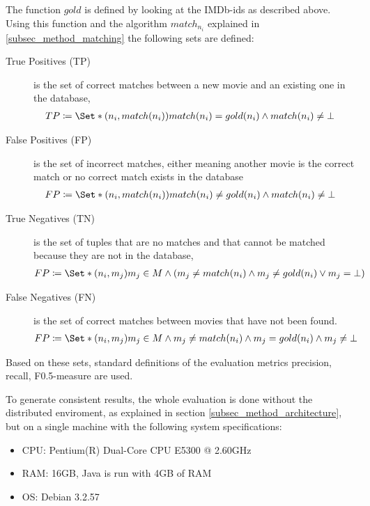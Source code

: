 The function $gold$ is defined by looking at the IMDb-ids as described above.
Using this function and the algorithm $match_{n_{i}}$ explained in \ref{subsec_method_matching} the following sets are defined:

\begin{description}
\item[True Positives (TP)] is the set of correct matches between a new movie and an existing one in the database,
\begin{align}
TP &\coloneqq \Set*{(n_i, match(n_i))}{match(n_i) = gold(n_i) \land match(n_i) \neq \bot}
\end{align}
\item[False Positives (FP)] is the set of incorrect matches, either meaning another movie is the correct match or no correct match exists in the database
\begin{align}
FP &\coloneqq \Set*{(n_i, match(n_i))}{match(n_i) \neq gold(n_i) \land match(n_i) \neq \bot}
\end{align}\item[True Negatives (TN)] is the set of tuples that are no matches and that cannot be matched because they are not in the database,
\begin{align}
FP &\coloneqq \Set*{(n_i, m_j)}{m_j \in M \land (m_j \neq match(n_i) \land m_j \neq gold(n_i) \lor m_j = \bot)}
\end{align}
\item[False Negatives (FN)] is the set of correct matches between movies that have not been found.
\begin{align}
FP &\coloneqq \Set*{(n_i, m_j)}{m_j \in M \land m_j \neq match(n_i) \land m_j = gold(n_i) \land m_j \neq \bot}
\end{align}
\end{description}

Based on these sets, standard definitions of the evaluation metrics precision, recall, F0.5-measure are used.

To generate consistent results, the whole evaluation is done without the distributed enviroment, as explained in section \ref{subsec_method_architecture}, but on a single machine with the following system specifications:
\begin{itemize}
	\item CPU: Pentium(R) Dual-Core  CPU E5300  @ 2.60GHz
	\item RAM: 16GB, Java is run with 4GB of RAM
	\item OS: Debian 3.2.57
\end{itemize}

